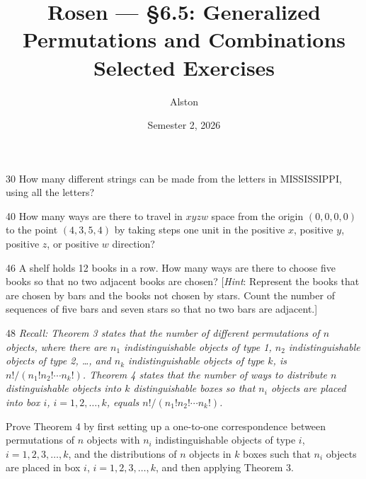 \documentclass[11pt]{article}
\title{Rosen --- \S 6.5: Generalized Permutations and Combinations\\ \large Selected Exercises}
\author{Alston}
\date{Semester 2, 2026}
\begin{document}
\maketitle

\begin{exercise}{30}
    How many different strings can be made from the letters in
    MISSISSIPPI, using all the letters?
\end{exercise}

\begin{exercise}{40}
    How many ways are there to travel in $xyzw$ space from the origin
    $(0,0,0,0)$ to the point $(4,3,5,4)$ by taking steps one unit in
    the positive $x$, positive $y$, positive $z$, or positive $w$
    direction?
\end{exercise}

\begin{exercise}{46}
    A shelf holds 12 books in a row. How many ways are there to
    choose five books so that no two adjacent books are chosen?
    [\emph{Hint}: Represent the books that are chosen by bars and the
    books not chosen by stars. Count the number of sequences of five
    bars and seven stars so that no two bars are adjacent.]
\end{exercise}

\begin{exercise}{48}
    \textit{Recall: Theorem 3 states that the number of different
    permutations of $n$ objects, where there are $n_1$
    indistinguishable objects of type 1, $n_2$ indistinguishable
    objects of type 2, \dots, and $n_k$ indistinguishable objects of
    type $k$, is $n!/(n_1! n_2! \cdots n_k!)$. Theorem 4 states that
    the number of ways to distribute $n$ distinguishable objects into
    $k$ distinguishable boxes so that $n_i$ objects are placed into
    box $i$, $i = 1, 2, \dots, k$, equals
    $n!/(n_1! n_2! \cdots n_k!)$.}

    Prove Theorem 4 by first setting up a one-to-one correspondence
    between permutations of $n$ objects with $n_i$ indistinguishable
    objects of type $i$, $i = 1, 2, 3, \dots, k$, and the
    distributions of $n$ objects in $k$ boxes such that $n_i$ objects
    are placed in box $i$, $i = 1, 2, 3, \dots, k$, and then applying
    Theorem 3.
\end{exercise}
\end{document}
